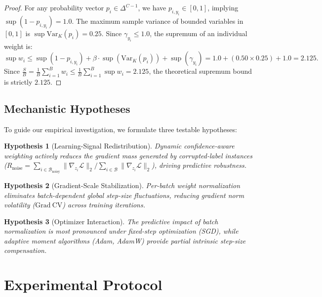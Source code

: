 \documentclass[preprint,12pt]{elsarticle}
\newtheorem{hypothesis}{Hypothesis}
\begin{document}
\begin{proof}
For any probability vector $p_i \in \Delta^{C-1}$, we have $p_{i, y_i} \in [0, 1]$, implying $\sup(1 - p_{i, y_i}) = 1.0$. The maximum sample variance of bounded variables in $[0, 1]$ is $\sup \mathrm{Var}_K(p_i) = 0.25$. Since $\gamma_{y_i} \le 1.0$, the supremum of an individual weight is:
\begin{equation}
\sup w_i \le \sup(1 - p_{i, y_i}) + \beta \cdot \sup(\mathrm{Var}_K(p_i)) + \sup(\gamma_{y_i}) = 1.0 + (0.50 \times 0.25) + 1.0 = 2.125.
\end{equation}
Since $\frac{S}{B} = \frac{1}{B}\sum_{i=1}^B w_i \le \frac{1}{B}\sum_{i=1}^B \sup w_i = 2.125$, the theoretical supremum bound is strictly $2.125$.
\end{proof}

\subsection{Mechanistic Hypotheses}

To guide our empirical investigation, we formulate three testable hypotheses:
\begin{hypothesis}[Learning-Signal Redistribution]
Dynamic confidence-aware weighting actively reduces the gradient mass generated by corrupted-label instances ($R_{\mathrm{noise}} = \sum_{i \in \mathcal{B}_{\mathrm{noisy}}} \|\nabla_{z_i} \mathcal{L}\|_2 / \sum_{i \in \mathcal{B}} \|\nabla_{z_i} \mathcal{L}\|_2$), driving predictive robustness.
\end{hypothesis}

\begin{hypothesis}[Gradient-Scale Stabilization]
Per-batch weight normalization eliminates batch-dependent global step-size fluctuations, reducing gradient norm volatility ($\mathrm{Grad~CV}$) across training iterations.
\end{hypothesis}

\begin{hypothesis}[Optimizer Interaction]
The predictive impact of batch normalization is most pronounced under fixed-step optimization (SGD), while adaptive moment algorithms (Adam, AdamW) provide partial intrinsic step-size compensation.
\end{hypothesis}


\section{Experimental Protocol}
\label{sec:experiments}
\end{document}
